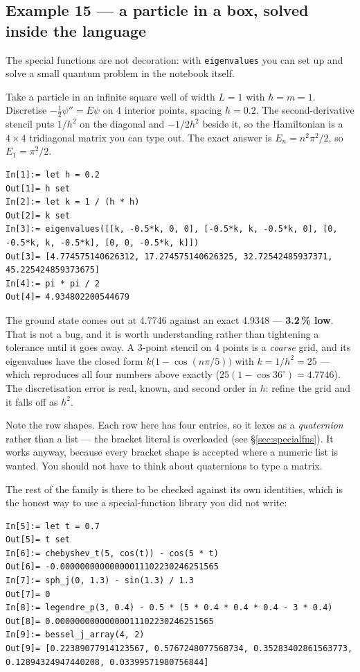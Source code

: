 \documentclass[11pt]{article}
\newcommand{\code}[1]{\texttt{#1}}
\begin{document}
\subsection{Example 15 --- a particle in a box, solved inside the language}

The special functions are not decoration: with \code{eigenvalues} you
can set up and solve a small quantum problem in the notebook itself.

Take a particle in an infinite square well of width $L=1$ with
$\hbar=m=1$. Discretise $-\tfrac12\psi''=E\psi$ on 4 interior points,
spacing $h=0.2$. The second-derivative stencil puts $1/h^2$ on the
diagonal and $-1/2h^2$ beside it, so the Hamiltonian is a $4\times4$
tridiagonal matrix you can type out. The exact answer is
$E_n=n^2\pi^2/2$, so $E_1=\pi^2/2$.

\begin{lstlisting}
In[1]:= let h = 0.2
Out[1]= h set
In[2]:= let k = 1 / (h * h)
Out[2]= k set
In[3]:= eigenvalues([[k, -0.5*k, 0, 0], [-0.5*k, k, -0.5*k, 0], [0, -0.5*k, k, -0.5*k], [0, 0, -0.5*k, k]])
Out[3]= [4.774575140626312, 17.274575140626325, 32.72542485937371, 45.225424859373675]
In[4]:= pi * pi / 2
Out[4]= 4.934802200544679
\end{lstlisting}

The ground state comes out at 4.7746 against an exact 4.9348 ---
\textbf{3.2\,\% low}. That is not a bug, and it is worth understanding
rather than tightening a tolerance until it goes away. A 3-point stencil
on 4 points is a \emph{coarse} grid, and its eigenvalues have the closed
form $k\bigl(1-\cos(n\pi/5)\bigr)$ with $k=1/h^2=25$ --- which
reproduces all four numbers above exactly
($25(1-\cos36^\circ)=4.7746$). The discretisation error is real, known,
and second order in $h$: refine the grid and it falls off as $h^2$.

Note the row shapes. Each row here has four entries, so it lexes as a
\emph{quaternion} rather than a list --- the bracket literal is
overloaded (see \S\ref{sec:specialfns}). It works anyway, because every
bracket shape is accepted where a numeric list is wanted. You should not
have to think about quaternions to type a matrix.

The rest of the family is there to be checked against its own
identities, which is the honest way to use a special-function library
you did not write:

\begin{lstlisting}
In[5]:= let t = 0.7
Out[5]= t set
In[6]:= chebyshev_t(5, cos(t)) - cos(5 * t)
Out[6]= -0.00000000000000011102230246251565
In[7]:= sph_j(0, 1.3) - sin(1.3) / 1.3
Out[7]= 0
In[8]:= legendre_p(3, 0.4) - 0.5 * (5 * 0.4 * 0.4 * 0.4 - 3 * 0.4)
Out[8]= 0.00000000000000011102230246251565
In[9]:= bessel_j_array(4, 2)
Out[9]= [0.22389077914123567, 0.5767248077568734, 0.35283402861563773, 0.12894324947440208, 0.03399571980756844]
\end{lstlisting}
\end{document}
